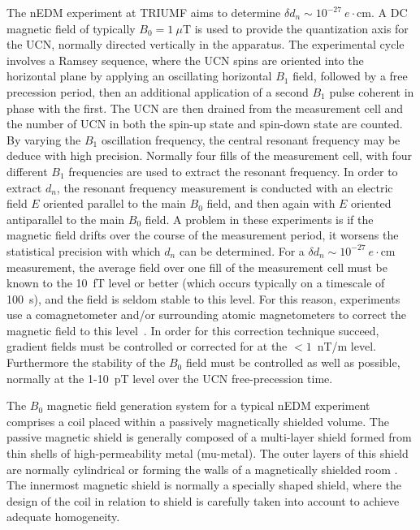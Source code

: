 \documentclass[review]{elsarticle}
\begin{document}
The nEDM experiment at TRIUMF aims to determine $\delta d_n\sim
10^{-27}~e\cdot$cm. A DC magnetic field of typically $B_0=1~\mu$T is
used to provide the quantization axis for the UCN, normally directed
vertically in the apparatus.  The experimental cycle involves a Ramsey
sequence, where the UCN spins are oriented into the horizontal plane
by applying an oscillating horizontal $B_1$ field, followed by a free
precession period, then an additional application of a second $B_1$
pulse coherent in phase with the first.  The UCN are then drained from
the measurement cell and the number of UCN in both the spin-up state
and spin-down state are counted.  By varying the $B_1$ oscillation
frequency, the central resonant frequency may be deduce with high
precision.  Normally four fills of the measurement cell, with four
different $B_1$ frequencies are used to extract the resonant
frequency.  In order to extract $d_n$, the resonant frequency
measurement is conducted with an electric field $E$ oriented parallel
to the main $B_0$ field, and then again with $E$ oriented antiparallel
to the main $B_0$ field.  A problem in these experiments is if the
magnetic field drifts over the course of the measurement period, it
worsens the statistical precision with which $d_n$ can be determined.
For a $\delta d_n\sim 10^{-27}~e\cdot$cm measurement, the average
field over one fill of the measurement cell must be known to the 10~fT
level or better (which occurs typically on a timescale of 100~s), and
the field is seldom stable to this level.  For this reason,
experiments use a comagnetometer and/or surrounding atomic
magnetometers to correct the magnetic field to this
level~\cite{bib:nedm4,bib:afach,bib:brys}.  In order for
this correction technique succeed, gradient fields must be controlled
or corrected for at the $<1$~nT/m level.  Furthermore the stability of
the $B_0$ field must be controlled as well as possible, normally at
the 1-10~pT level over the UCN free-precession time.


The $B_0$ magnetic field generation system for a typical nEDM
experiment comprises a coil placed within a passively magnetically
shielded volume.  The passive magnetic shield is generally composed of
a multi-layer shield formed from thin shells of high-permeability
metal (mu-metal).  The outer layers of this shield are normally
cylindrical \cite{bib:nedm3.5, bib: nedm2
} or forming the walls of a magnetically
shielded room \cite{bib:altarev2014}.  The innermost magnetic shield is normally
a specially shaped shield, where the design of the coil in relation to
shield is carefully taken into account to achieve adequate
homogeneity.
\end{document}
